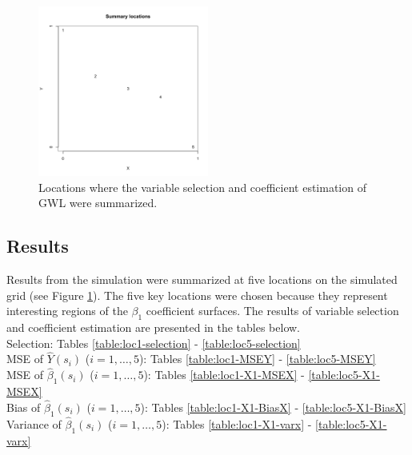 \documentclass[authoryear, review, 11pt]{elsarticle}
\begin{document}
	\begin{figure}
		\begin{center}
			\includegraphics[width=0.5\textwidth]{../../figures/simulation/illustrations/summary-locations.pdf}
			\caption{Locations where the variable selection and coefficient estimation of GWL were summarized.\label{fig:summary-locations}}
		\end{center}
	\end{figure}
	
	\subsection{Results}
	Results from the simulation were summarized at five locations on the simulated grid (see Figure \ref{fig:summary-locations}). The five key locations were chosen because they represent interesting regions of the $\beta_1$ coefficient surfaces. The results of variable selection  and coefficient estimation  are presented in the tables below.\\	
	Selection: Tables \ref{table:loc1-selection} - \ref{table:loc5-selection}\\
	MSE of $\hat{Y}(s_i)$ ($i = 1, \dots, 5$): Tables \ref{table:loc1-MSEY} - \ref{table:loc5-MSEY}\\
	MSE of $\hat{\beta}_1(s_i)$ ($i = 1, \dots, 5$): Tables \ref{table:loc1-X1-MSEX} - \ref{table:loc5-X1-MSEX}\\
	Bias of $\hat{\beta}_1(s_i)$ ($i = 1, \dots, 5$): Tables \ref{table:loc1-X1-BiasX} - \ref{table:loc5-X1-BiasX}\\
	Variance of $\hat{\beta}_1(s_i)$ ($i = 1, \dots, 5$): Tables \ref{table:loc1-X1-varx} - \ref{table:loc5-X1-varx}\\
	
	
\end{document}
